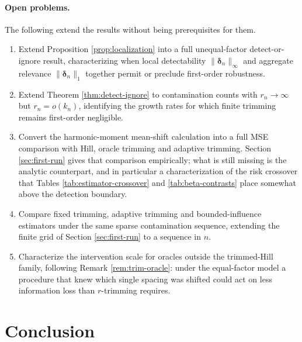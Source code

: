 \documentclass[11pt]{article}
\begin{document}
\paragraph{Open problems.}
The following extend the results without being prerequisites for them.
\begin{enumerate}
\item Extend Proposition \ref{prop:localization} into a full unequal-factor
detect-or-ignore result, characterizing when local detectability
$\|\boldsymbol\delta_n\|_\infty$ and aggregate relevance
$\|\boldsymbol\delta_n\|_1$ together permit or preclude first-order
robustness.
\item Extend Theorem \ref{thm:detect-ignore} to contamination counts with
$r_n\to\infty$ but $r_n=o(k_n)$, identifying the growth rates for which finite
trimming remains first-order negligible.
\item Convert the harmonic-moment mean-shift calculation into a full MSE
comparison with Hill, oracle trimming and adaptive trimming.  Section
\ref{sec:first-run} gives that comparison empirically; what is still missing is
the analytic counterpart, and in particular a characterization of the risk
crossover that Tables \ref{tab:estimator-crossover} and
\ref{tab:beta-contrasts} place somewhat above the detection boundary.
\item Compare fixed trimming, adaptive trimming and bounded-influence
estimators under the same sparse contamination sequence, extending the finite
grid of Section \ref{sec:first-run} to a sequence in $n$.
\item Characterize the intervention scale for oracles outside the trimmed-Hill
family, following Remark \ref{rem:trim-oracle}: under the equal-factor model a
procedure that knew which single spacing was shifted could act on less
information loss than $r$-trimming requires.
\end{enumerate}

\section{Conclusion}
\end{document}
